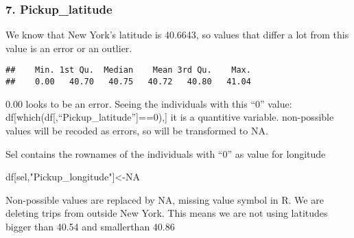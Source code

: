 \documentclass[
  18pt,
  a4paper]{article}
\newenvironment{Shaded}{\begin{snugshade}}{\end{snugshade}}
\newcommand{\CommentTok}[1]{\textcolor[rgb]{0.56,0.35,0.01}{\textit{#1}}}
\newcommand{\DecValTok}[1]{\textcolor[rgb]{0.00,0.00,0.81}{#1}}
\newcommand{\KeywordTok}[1]{\textcolor[rgb]{0.13,0.29,0.53}{\textbf{#1}}}
\newcommand{\NormalTok}[1]{#1}
\newcommand{\OperatorTok}[1]{\textcolor[rgb]{0.81,0.36,0.00}{\textbf{#1}}}
\newcommand{\OtherTok}[1]{\textcolor[rgb]{0.56,0.35,0.01}{#1}}
\newcommand{\StringTok}[1]{\textcolor[rgb]{0.31,0.60,0.02}{#1}}
\begin{document}
\hypertarget{pickup_latitude}{%
\subsubsection{7. Pickup\_latitude}\label{pickup_latitude}}

We know that New York's latitude is 40.6643, so values that differ a lot
from this value is an error or an outlier.

\begin{Shaded}
\end{Shaded}

\begin{verbatim}
##    Min. 1st Qu.  Median    Mean 3rd Qu.    Max. 
##    0.00   40.70   40.75   40.72   40.80   41.04
\end{verbatim}

0.00 looks to be an error. Seeing the individuals with this ``0'' value:
df{[}which(df{[},``Pickup\_latitude''{]}==0),{]} it is a quantitive
variable. non-possible values will be recoded as errors, so will be
transformed to NA.

\begin{Shaded}
\end{Shaded}

Sel contains the rownames of the individuals with ``0'' as value for
longitude

\begin{Shaded}
\begin{Highlighting}[]
\NormalTok{df[sel,}\StringTok{"Pickup_longitude"}\NormalTok{]<-}\OtherTok{NA}  
\end{Highlighting}
\end{Shaded}

Non-possible values are replaced by NA, missing value symbol in R. We
are deleting trips from outside New York. This means we are not using
latitudes bigger than 40.54 and smallerthan 40.86
\end{document}
